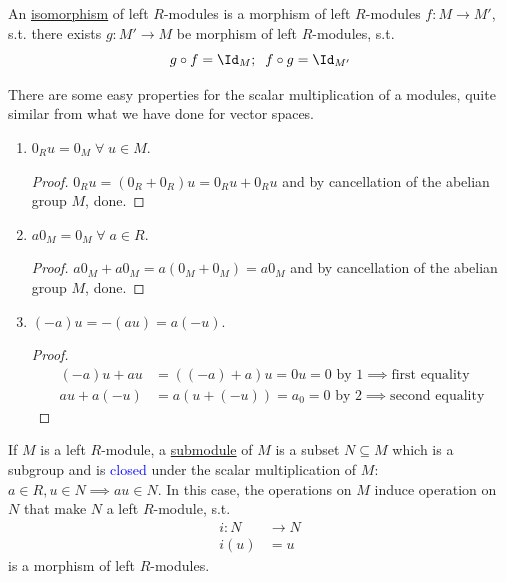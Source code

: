 \begin{definition}
	An \underline{isomorphism} of left \( R \)-modules is a morphism of left \( R \)-modules \( f: M
	\to M' \), s.t. there exists \( g: M' \to M \) be morphism of left \( R \)-modules, s.t.
	\[
		g\circ f = \Id_{M}; \; \; f\circ g = \Id_{M'}
	\]
\end{definition}
There are some easy properties for the scalar multiplication of a modules, quite similar from what
we have done for vector spaces.
\begin{remark}
	\leavevmode
	\begin{enumerate}
		\item \( 0_R u = 0_M \; \forall \; u \in M \).
		      \begin{proof}
			      \( 0_R u = (0_R + 0_R) u = 0_R u + 0_R u \) and by cancellation of the abelian group \(
			      M\), done.
		      \end{proof}
		\item \( a 0_M = 0_M \; \forall \; a\in R \).
		      \begin{proof}
			      \( a0_M + a0_M = a(0_M + 0_M) = a 0_M \) and by cancellation of the abelian group \( M
			      \), done.
		      \end{proof}
		\item \( (-a) u = -(au) = a(-u) \).
		      \begin{proof}
			      \leavevmode
			      \[
				      \begin{aligned}
					      (-a)u + au & = ((-a) + a) u = 0u = 0 \text{ by 1} \implies \text{first equality}  \\
					      au+a(-u)   & = a(u+(-u)) = a_{0} = 0 \text{ by 2} \implies \text{second equality}
				      \end{aligned}
			      \]
		      \end{proof}
	\end{enumerate}
\end{remark}

\begin{definition}
	If \( M \) is a left \( R \)-module, a \underline{submodule} of \( M \) is a subset \( N \subseteq
	M\) which is a subgroup and is \textcolor{blue}{closed} under the scalar multiplication of \( M
	\): \( a\in R, u\in N \implies au \in N \). In this case, the operations on \( M \) induce
	operation on \( N \) that make \( N \) a left \( R \)-module, s.t.
	\begin{align*}
		i: N & \to N \\
		i(u) & = u
	\end{align*}
	is a morphism of left \( R \)-modules.
\end{definition}

